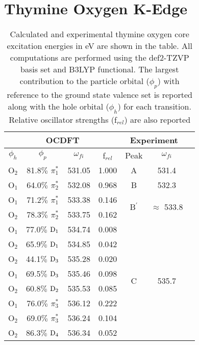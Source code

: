 \documentclass[12pt]{article}
\begin{document}
\section{Thymine Oxygen K-Edge} 
\setcounter{table}{0}
\makeatletter 
\renewcommand{\thetable}{S\arabic{table}}
   \begin{table}[!h]
   \footnotesize
 \centering
          \caption{Calculated and experimental thymine oxygen core excitation energies in eV are shown in the table. All computations are performed using the def2-TZVP basis set and B3LYP functional. The largest contribution to the particle orbital ($\phi_p$) with reference to the ground state valence set is reported along with the hole orbital ($\phi_h$) for each transition. Relative oscillator strengths (f$_{rel}$) are also reported}
     \begin{tabular}{c@{\hskip 0.22in}c@{\hskip 0.22in}c@{\hskip 0.22in}c@{\hskip 0.52in}c@{\hskip 0.22in}c@{\hskip 0.22in}c}
     \hline
     \hline
   \multicolumn{4}{c}{OCDFT} &\multicolumn{2}{c}{Experiment} \\
   \hline
 $\phi_h$ &  $\phi_p$ & $\omega_{fi}$ & f$_{rel}$ & Peak &  $\omega_{fi}$   \\
   \hline
    O$_2$
 &   81.8$\%$ $\pi_1^*$  & 531.05 & 1.000 & A  & 531.4
 \vspace{0.1in}\\
    O$_1$
 &   64.0$\%$ $\pi_2^*$  & 532.08 & 0.968 & B & 532.3
 \vspace{0.1in}\\
    O$_1$
 &   71.2$\%$ $\pi_1^*$  & 533.38 & 0.146 & \multirow{2}{*}{B$^{\prime}$} & \multirow{2}{*}{$\approx$ 533.8}  \\
    O$_2$
 &   78.3$\%$ $\pi_2^*$  & 533.75 & 0.162 
 \vspace{0.1in}\\
    O$_1$
 &   77.0$\%$ $\rm D_1$  & 534.74 & 0.008  & \multirow{9}{*}{C} & \multirow{9}{*}{535.7} \\
    O$_2$
 &   65.9$\%$ $\rm D_1$  & 534.85 & 0.042 \\
    O$_2$
 &   44.1$\%$ $\rm D_3$  & 535.28 & 0.020 \\
    O$_1$
 &   69.5$\%$ $\rm D_3$  & 535.46 & 0.098 \\
    O$_2$
 &   60.8$\%$ $\rm D_2$  & 535.53 & 0.085 \\
    O$_1$
 &   76.0$\%$ $\pi_3^*$  & 536.12 & 0.222 \\
    O$_2$
 &   69.0$\%$ $\pi_3^*$  & 536.24 & 0.104 \\
    O$_2$
 &   86.3$\%$ $\rm D_4$  & 536.34 & 0.052 \\

\end{tabular}
\end{table}
\end{document}
